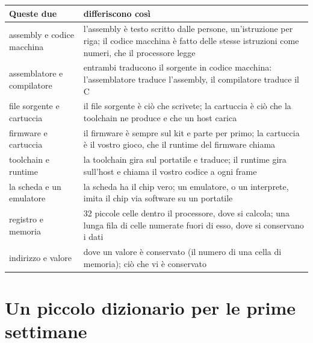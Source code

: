 \begin{center}\small
\begin{tabularx}{\textwidth}{@{}lL@{}}
\toprule
\textbf{Queste due} & \textbf{differiscono così}\\
\midrule
assembly e codice macchina & l'assembly è testo scritto dalle persone, un'istruzione per riga; il codice macchina è fatto delle stesse istruzioni come numeri, che il processore legge\\
assemblatore e compilatore & entrambi traducono il sorgente in codice macchina: l'assemblatore traduce l'assembly, il compilatore traduce il C\\
file sorgente e cartuccia & il file sorgente è ciò che scrivete; la cartuccia è ciò che la toolchain ne produce e che un host carica\\
firmware e cartuccia & il firmware è sempre sul kit e parte per primo; la cartuccia è il vostro gioco, che il runtime del firmware chiama\\
toolchain e runtime & la toolchain gira sul portatile e traduce; il runtime gira sull'host e chiama il vostro codice a ogni frame\\
la scheda e un emulatore & la scheda ha il chip vero; un emulatore, o un interprete, imita il chip via software su un portatile\\
registro e memoria & 32 piccole celle dentro il processore, dove si calcola; una lunga fila di celle numerate fuori di esso, dove si conservano i dati\\
indirizzo e valore & dove un valore è conservato (il numero di una cella di memoria); ciò che vi è conservato\\
\bottomrule
\end{tabularx}
\end{center}

\section*{Un piccolo dizionario per le prime settimane}

